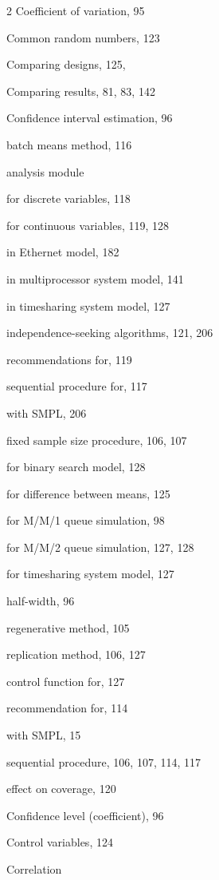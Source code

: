 \begin{multicols}{2}
\noindent Coefficient of variation, 95\par
\noindent Common random numbers, 123\par
\noindent Comparing designs, 125,\par
\noindent Comparing results, 81, 83, 142\par
\columnbreak
\noindent Confidence interval estimation, 96\par
\quad batch means method, 116\par
\qquad analysis module\par
\qquad\quad for discrete variables, 118\par
\qquad\quad for continuous variables, 119, 128\par
\qquad in Ethernet model, 182\par
\qquad in multiprocessor system model, 141\par
\qquad in timesharing system model, 127\par
\qquad independence-seeking algorithms, 121, 206\par
\qquad recommendations for, 119\par
\qquad sequential procedure for, 117\par
\qquad with SMPL, 206\par
\quad fixed sample size procedure, 106, 107\par
\quad for binary search model, 128\par
\quad for difference between means, 125\par
\quad for M/M/1 queue simulation, 98\par
\quad for M/M/2 queue simulation, 127, 128\par
\quad for timesharing system model, 127\par
\quad half-width, 96\par
\quad regenerative method, 105\par
\quad replication method, 106, 127\par
\qquad control function for, 127\par
\qquad recommendation for, 114\par
\qquad with SMPL, 15\par
\quad sequential procedure, 106, 107, 114, 117\par
\qquad effect on coverage, 120\par
\noindent Confidence level (coefficient), 96\par
\noindent Control variables, 124\par
\noindent Correlation\par

\end{multicols}
